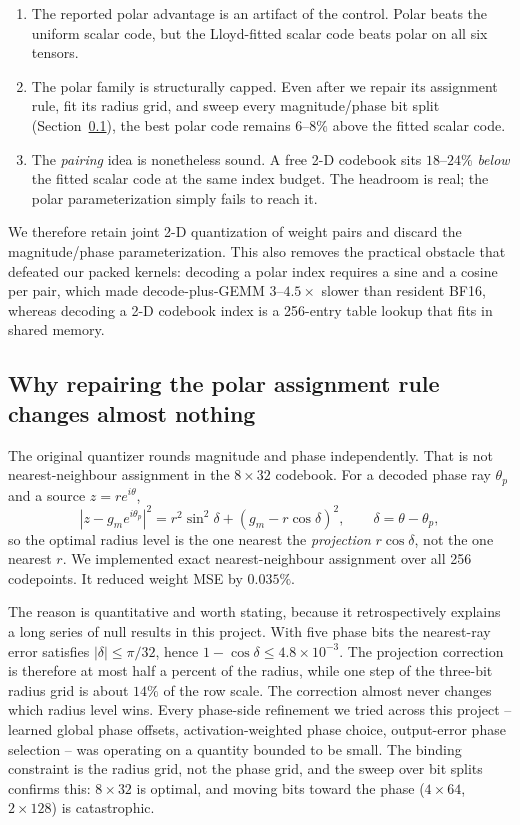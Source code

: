 \begin{enumerate}
\item The reported polar advantage is an artifact of the control. Polar beats
the uniform scalar code, but the Lloyd-fitted scalar code beats polar on all
six tensors.
\item The polar family is structurally capped. Even after we repair its
assignment rule, fit its radius grid, and sweep every magnitude/phase bit split
(Section~\ref{sec:polarfix}), the best polar code remains $6$--$8\%$ above the
fitted scalar code.
\item The \emph{pairing} idea is nonetheless sound. A free 2-D codebook sits
$18$--$24\%$ \emph{below} the fitted scalar code at the same index budget. The
headroom is real; the polar parameterization simply fails to reach it.
\end{enumerate}

We therefore retain joint 2-D quantization of weight pairs and discard the
magnitude/phase parameterization. This also removes the practical obstacle that
defeated our packed kernels: decoding a polar index requires a sine and a
cosine per pair, which made decode-plus-GEMM $3$--$4.5\times$ slower than
resident BF16, whereas decoding a 2-D codebook index is a 256-entry table
lookup that fits in shared memory.

\subsection{Why repairing the polar assignment rule changes almost nothing}
\label{sec:polarfix}

The original quantizer rounds magnitude and phase independently. That is not
nearest-neighbour assignment in the $8\times32$ codebook. For a decoded phase
ray $\theta_p$ and a source $z=re^{i\theta}$,
\begin{equation}
 |z-g_m e^{i\theta_p}|^2 = r^2\sin^2\delta + (g_m - r\cos\delta)^2,
 \qquad \delta=\theta-\theta_p ,
\end{equation}
so the optimal radius level is the one nearest the \emph{projection}
$r\cos\delta$, not the one nearest $r$. We implemented exact nearest-neighbour
assignment over all 256 codepoints. It reduced weight MSE by $0.035\%$.

The reason is quantitative and worth stating, because it retrospectively
explains a long series of null results in this project. With five phase bits
the nearest-ray error satisfies $|\delta|\le\pi/32$, hence
$1-\cos\delta \le 4.8\times10^{-3}$. The projection correction is therefore at
most half a percent of the radius, while one step of the three-bit radius grid
is about $14\%$ of the row scale. The correction almost never changes which
radius level wins. Every phase-side refinement we tried across this project --
learned global phase offsets, activation-weighted phase choice, output-error
phase selection -- was operating on a quantity bounded to be small. The binding
constraint is the radius grid, not the phase grid, and the sweep over bit
splits confirms this: $8\times32$ is optimal, and moving bits toward the phase
($4\times64$, $2\times128$) is catastrophic.

